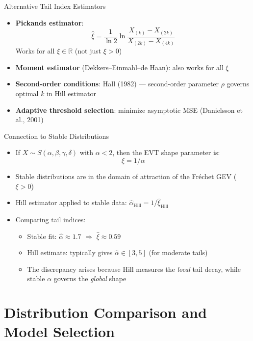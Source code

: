 \documentclass[9pt, aspectratio=169, t]{beamer}
\theoremstyle{definition}
\newcommand{\R}{\mathbb{R}}
\begin{document}
\begin{frame}{Alternative Tail Index Estimators}
\begin{itemize}
\item \textbf{Pickands estimator}:
\[
\hat{\xi} = \frac{1}{\ln 2}\ln\frac{X_{(k)} - X_{(2k)}}{X_{(2k)} - X_{(4k)}}
\]
Works for all $\xi \in \R$ (not just $\xi > 0$)
\item \textbf{Moment estimator} (Dekkers--Einmahl--de Haan): also works for all $\xi$
\item \textbf{Second-order conditions}: Hall (1982) --- second-order parameter $\rho$ governs optimal $k$ in Hill estimator
\item \textbf{Adaptive threshold selection}: minimize asymptotic MSE (Danielsson et al., 2001)
\end{itemize}
\end{frame}

\begin{frame}{Connection to Stable Distributions}
\begin{itemize}
\item If $X \sim S(\alpha, \beta, \gamma, \delta)$ with $\alpha < 2$, then the EVT shape parameter is:
\[
\xi = 1/\alpha
\]
\item Stable distributions are in the domain of attraction of the Fr\'{e}chet GEV ($\xi > 0$)
\item Hill estimator applied to stable data: $\hat{\alpha}_{\text{Hill}} = 1/\hat{\xi}_{\text{Hill}}$
\item Comparing tail indices:
\begin{itemize}
\item Stable fit: $\hat{\alpha} \approx 1.7$ $\Rightarrow$ $\hat{\xi} \approx 0.59$
\item Hill estimate: typically gives $\hat{\alpha} \in [3, 5]$ (for moderate tails)
\item The discrepancy arises because Hill measures the \textit{local} tail decay, while stable $\alpha$ governs the \textit{global} shape
\end{itemize}
\end{itemize}
\end{frame}

\section{Distribution Comparison and Model Selection}
\end{document}
